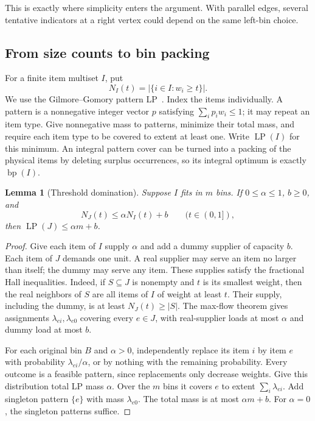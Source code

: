 \documentclass[11pt]{article}
\newtheorem{lemma}[theorem]{Lemma}
\theoremstyle{definition}\newtheorem{algorithm}{Algorithm}[section]
\numberwithin{equation}{section}
\theoremstyle{remark}\newtheorem*{remark}{Remark}
\begin{document}
This is exactly where simplicity enters the argument. With parallel
edges, several tentative indicators at a right vertex could depend on
the same left-bin choice.

\subsection{From size counts to bin packing}
For a finite item multiset $I$, put
\[
 N_I(t)=|\{i\in I:w_i\ge t\}|.
\]
We use the Gilmore--Gomory pattern LP~\cite{GG61}. Index the items
individually. A pattern is a nonnegative integer vector $p$ satisfying
$\sum_i p_iw_i\le1$; it may repeat an item type. Give nonnegative mass
to patterns, minimize their total mass, and require each item type to
be covered to extent at least one. Write $\operatorname{LP}(I)$ for
this minimum. An integral pattern cover can be turned into a packing
of the physical items by deleting surplus occurrences, so its integral
optimum is exactly $\operatorname{bp}(I)$.

\begin{lemma}[Threshold domination]\label{lem:threshold-domination}
Suppose $I$ fits in $m$ bins. If $0\le\alpha\le1$, $b\ge0$, and
\[
 N_J(t)\le\alpha N_I(t)+b\qquad(t\in(0,1]),
\]
then $\operatorname{LP}(J)\le\alpha m+b$.
\end{lemma}
\begin{proof}
Give each item of $I$ supply $\alpha$ and add a dummy supplier of
capacity $b$. Each item of $J$ demands one unit. A real supplier may
serve an item no larger than itself; the dummy may serve any item.
These supplies satisfy the fractional Hall inequalities. Indeed, if
$S\subseteq J$ is nonempty and $t$ is its smallest weight, then the
real neighbors of $S$ are all items of $I$ of weight at least $t$.
Their supply, including the dummy, is at least $N_J(t)\ge|S|$.
The max-flow theorem gives assignments $\lambda_{ei},\lambda_{e0}$
covering every $e\in J$, with real-supplier loads at most $\alpha$
and dummy load at most $b$.

For each original bin $B$ and $\alpha>0$, independently replace its
item $i$ by item $e$ with probability $\lambda_{ei}/\alpha$, or by
nothing with the remaining probability. Every outcome is a feasible
pattern, since replacements only decrease weights. Give this distribution
total LP mass $\alpha$. Over the $m$ bins it covers $e$ to extent
$\sum_i\lambda_{ei}$. Add singleton pattern $\{e\}$ with mass
$\lambda_{e0}$. The total mass is at most $\alpha m+b$.
For $\alpha=0$, the singleton patterns suffice.
\end{proof}
\end{document}
